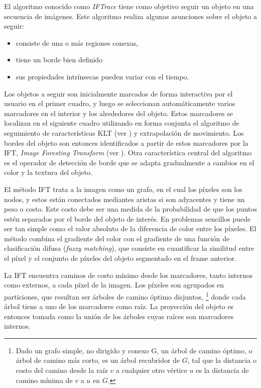 \documentclass[a4paper,10pt]{article}
\begin{document}
El algoritmo conocido como \textit{IFTrace} \cite{IFTrace} tiene como objetivo
seguir un objeto en una secuencia de imágenes. Este algoritmo realiza algunas
asunciones sobre el objeto a seguir:

\begin{itemize}
    \item consiste de una o más regiones conexas,
    \item tiene un borde bien definido
    \item sus propiedades intrínsecas pueden variar con el tiempo.
\end{itemize}

Los objetos a seguir son inicialmente marcados de forma interactiva por el
usuario en el primer cuadro, y luego se seleccionan automáticamente varios
marcadores en el interior y los alrededores del objeto. Estos marcadores se
localizan en el siguiente cuadro utilizando en forma conjunta el algoritmo de
seguimiento de características KLT (ver \cite{KLT}) y extrapolación de
movimiento. Los bordes del objeto son entonces identificados a partir de estos
marcadores por la IFT, \textit{Image Foresting Transform} (ver \cite{IFT}).
Otra característica central del algoritmo es el operador de detección de borde
que se adapta gradualmente a cambios en el color y la textura del objeto.

El método IFT trata a la imagen como un grafo, en el cual los píxeles son los
nodos, y estos están conectados mediantes aristas si son adyacentes y tiene un
peso o costo. Este costo debe ser una medida de la probabilidad de que los
puntos estén separados por el borde del objeto de interés. En problemas
sencillos puede ser tan simple como el valor absoluto de la diferencia de color
entre los píxeles. El método combina el gradiente del color con el gradiente de
una función de clasificación difusa (\textit{fuzzy matching}), que consiste en
cuantificar la similitud entre el píxel y el conjunto de píxeles del objeto
segmentado en el frame anterior.

La IFT encuentra caminos de costo mínimo desde los marcadores, tanto internos
como externos, a cada píxel de la imagen. Los píxeles son agrupados en
particiones, que resultan ser árboles de camino óptimo disjuntos,
\footnote{Dado un grafo simple, no dirigido y conexo G, un árbol de camino
  óptimo, o árbol de camino más corto, es un árbol recubridor de $G$, tal que
  la distancia o costo del camino desde la raíz $v$ a cualquier otro vértice
$u$ es la distancia de camino mínima de $v$ a $u$ en $G$.} donde cada árbol
tiene a uno de los marcadores como raíz. La proyección del objeto es entonces
tomada como la unión de los árboles cuyas raíces son marcadores internos.
\end{document}
